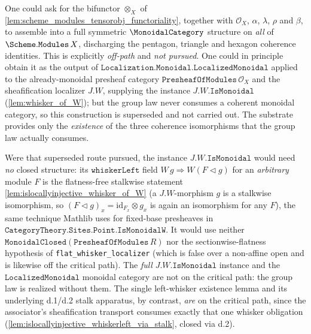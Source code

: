 \begin{remark}
  \label{rem:scheme_modules_monoidal_off_path}
  One could ask for the bifunctor \(\otimes_X\) of
  \cref{lem:scheme_modules_tensorobj_functoriality}, together with
  \(\mathcal{O}_X\), \(\alpha\), \(\lambda\), \(\rho\) and \(\beta\), to
  assemble into a full symmetric \(\MonoidalCategory\) structure on
  \emph{all} of \(\Scheme.\mathtt{Modules}\,X\), discharging the pentagon,
  triangle and hexagon coherence identities. This is explicitly \emph{off-path}
  and \emph{not pursued}. One could in principle obtain it as the output of
  \(\mathtt{Localization.Monoidal.LocalizedMonoidal}\) applied to the
  already-monoidal presheaf category \(\mathtt{PresheafOfModules}\,\mathcal{O}_X\)
  and the sheafification localizer \(J.W\), supplying the instance
  \(J.W.\mathtt{IsMonoidal}\) (\cref{lem:whisker_of_W}); but the group law never
  consumes a coherent monoidal category, so this construction is superseded and not
  carried out. The substrate provides only the \emph{existence} of the three
  coherence isomorphisms that the group law actually consumes.

  Were that superseded route pursued, the instance \(J.W.\mathtt{IsMonoidal}\)
  would need \emph{no} closed structure: its
  \(\mathtt{whiskerLeft}\) field \(W\,g \Rightarrow W(F \triangleleft g)\) for an
  \emph{arbitrary} module \(F\) is the flatness-free stalkwise statement
  \cref{lem:islocallyinjective_whisker_of_W} (a \(J.W\)-morphism \(g\) is a
  stalkwise isomorphism, so \((F \triangleleft g)_x = \mathrm{id}_{F_x} \otimes
  g_x\) is again an isomorphism for any \(F\)), the same technique Mathlib uses for
  fixed-base presheaves in
  \(\mathtt{CategoryTheory.Sites.Point.IsMonoidalW}\). It would use neither
  \(\mathtt{MonoidalClosed}(\mathtt{PresheafOfModules}\,R)\) nor the
  sectionwise-flatness hypothesis of \texttt{flat\_whisker\_localizer} (which is
  false over a non-affine open and is likewise off the critical path). The \emph{full}
  \(J.W.\mathtt{IsMonoidal}\) instance and the \(\mathtt{LocalizedMonoidal}\) monoidal
  category are not on the critical path: the group law is realized without them. The
  single left-whisker existence lemma and its underlying d.1/d.2 stalk apparatus, by
  contrast, \emph{are} on the critical path, since the associator's sheafification
  transport consumes exactly that one whisker obligation
  (\cref{lem:islocallyinjective_whiskerleft_via_stalk}, closed via d.2).


\end{remark}
